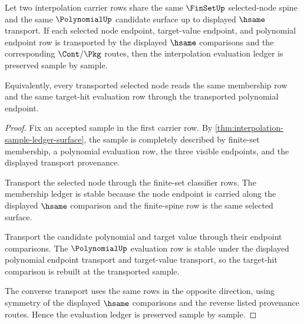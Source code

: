 \begin{theorem}
\label{thm:interpolation-evaluation-stability}
Let two interpolation carrier rows share the same $\FinSetUp$ selected-node
spine and the same $\PolynomialUp$ candidate surface up to displayed $\hsame$
transport. If each selected node endpoint, target-value endpoint, and
polynomial endpoint row is transported by the displayed $\hsame$ comparisons
and the corresponding $\Cont/\Pkg$ routes, then the interpolation evaluation
ledger is preserved sample by sample.

Equivalently, every transported selected node reads the same membership row and
the same target-hit evaluation row through the transported polynomial endpoint.
\end{theorem}
\begin{proof}
Fix an accepted sample in the first carrier row. By
\autoref{thm:interpolation-sample-ledger-surface}, the sample is completely
described by finite-set membership, a polynomial evaluation row, the three
visible endpoints, and the displayed transport provenance.

Transport the selected node through the finite-set classifier rows. The
membership ledger is stable because the node endpoint is carried along the
displayed $\hsame$ comparison and the finite-spine row is the same selected
surface.

Transport the candidate polynomial and target value through their endpoint
comparisons. The $\PolynomialUp$ evaluation row is stable under the displayed
polynomial endpoint transport and target-value transport, so the target-hit
comparison is rebuilt at the transported sample.

The converse transport uses the same rows in the opposite direction, using
symmetry of the displayed $\hsame$ comparisons and the reverse listed
provenance routes. Hence the evaluation ledger is preserved sample by sample.
\end{proof}


